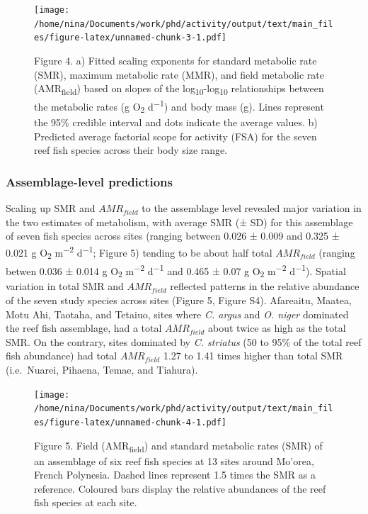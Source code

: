 \documentclass[
]{article}
\begin{document}
\begin{figure}
\centering
\texttt{[image: /home/nina/Documents/work/phd/activity/output/text/main\_files/figure-latex/unnamed-chunk-3-1.pdf]}
\caption{Figure 4. a) Fitted scaling exponents for standard metabolic
rate (SMR), maximum metabolic rate (MMR), and field metabolic rate
(AMR\textsubscript{field}) based on slopes of the
log\textsubscript{10}-log\textsubscript{10} relationships between the
metabolic rates (g O\textsubscript{2} d\textsuperscript{−1}) and body
mass (g). Lines represent the 95\% credible interval and dots indicate
the average values. b) Predicted average factorial scope for activity
(FSA) for the seven reef fish species across their body size range.}
\end{figure}

\newpage

\hypertarget{assemblage-level-predictions}{%
\subsubsection{Assemblage-level
predictions}\label{assemblage-level-predictions}}

\noindent Scaling up SMR and \(AMR_{field}\) to the assemblage level
revealed major variation in the two estimates of metabolism, with
average SMR (± SD) for this assemblage of seven fish species across
sites (ranging between 0.026 ± 0.009 and 0.325 ± 0.021 g
O\textsubscript{2} m\textsuperscript{−2} d\textsuperscript{−1}; Figure
5) tending to be about half total \(AMR_{field}\) (ranging betwen 0.036
± 0.014 g O\textsubscript{2} m\textsuperscript{−2} d\textsuperscript{−1}
and 0.465 ± 0.07 g O\textsubscript{2} m\textsuperscript{−2}
d\textsuperscript{−1}). Spatial variation in total SMR and
\(AMR_{field}\) reflected patterns in the relative abundance of the
seven study species across sites (Figure 5, Figure S4). Afareaitu,
Maatea, Motu Ahi, Taotaha, and Tetaiuo, sites where \emph{C. argus} and
\emph{O. niger} dominated the reef fish assemblage, had a total
\(AMR_{field}\) about twice as high as the total SMR. On the contrary,
sites dominated by \emph{C. striatus} (50 to 95\% of the total reef fish
abundance) had total \(AMR_{field}\) 1.27 to 1.41 times higher than
total SMR (i.e.~Nuarei, Pihaena, Temae, and Tiahura). \newpage

\begin{figure}
\centering
\texttt{[image: /home/nina/Documents/work/phd/activity/output/text/main\_files/figure-latex/unnamed-chunk-4-1.pdf]}
\caption{Figure 5. Field (AMR\textsubscript{field}) and standard
metabolic rates (SMR) of an assemblage of six reef fish species at 13
sites around Mo'orea, French Polynesia. Dashed lines represent 1.5 times
the SMR as a reference. Coloured bars display the relative abundances of
the reef fish species at each site.}
\end{figure}
\end{document}
